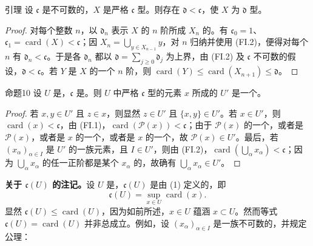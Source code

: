 \begin{SGAresult}{引理}{}
设 $\mathfrak{c}$ 是不可数的，$X$ 是严格 $\mathfrak{c}$ 型。则存在 $\mathfrak{d}<\mathfrak{c}$，使 $X$ 为 $\mathfrak{d}$ 型。
\end{SGAresult}
\begin{proof}
对每个整数 $n$，以 $\mathfrak{d}_n$ 表示 $X$ 的 $n$ 阶所成 $X_n$ 的。有 $\mathfrak{c}_0=1$、$\mathfrak{c}_1=\operatorname{card}(X)<\mathfrak{c}$；因 $X_n=\bigcup_{y\in X_{n-1}}y$，对 $n$ 归纳并使用 (FI.2)，便得对每个 $n$ 有 $\mathfrak{d}_n<\mathfrak{c}$。于是各 $\mathfrak{d}_n$ 都以 $\mathfrak{d}=\sum_{j\geq0}\mathfrak{d}_j$ 为上界，由 (FI.2) 及 $\mathfrak{c}$ 不可数的假设，$\mathfrak{d}<\mathfrak{c}$。若 $Y$ 是 $X$ 的一个 $n$ 阶，则 $\operatorname{card}(Y)\leq\operatorname{card}(X_{n+1})\leq\mathfrak{d}$。
\end{proof}
\begin{SGAresult}{命题}{10}
设 $U$ 是，$\mathfrak{c}$ 是。则 $U$ 中严格 $\mathfrak{c}$ 型的元素 $x$ 所成的 $U'$ 是一个。
\end{SGAresult}
\begin{proof}
若 $x,y\in U'$ 且 $z\in x$，则显然 $z\in U'$ 且 $\{x,y\}\in U'$。若 $x\in U'$，则 $\operatorname{card}(x)<\mathfrak{c}$，由 (FI.1)，$\operatorname{card}(\mathcal P(x))<\mathfrak{c}$；由于 $\mathcal P(x)$ 的一个，或者是 $\mathcal P(x)$，或者是 $x$ 的一个，或者是 $x$ 的一个，故 $\mathcal P(x)\in U'$。最后，若 $(x_\alpha)_{\alpha\in I}$ 是 $U'$ 的一族元素，且 $I\in U'$，则由 (FI.2)，$\operatorname{card}(\bigcup_\alpha x_\alpha)<\mathfrak{c}$；因为 $\bigcup_\alpha x_\alpha$ 的任一正阶都是某个 $x_\alpha$ 的，故确有 $\bigcup_\alpha x_\alpha\in U'$。
\end{proof}
\textbf{关于 $\mathfrak{c}(U)$ 的注记。}设 $U$ 是，$\mathfrak{c}(U)$ 是由 (1) 定义的，即
\[
 \mathfrak{c}(U)=\sup_{x\in U}\operatorname{card}(x).
\]
显然 $\mathfrak{c}(U)\leq\operatorname{card}(U)$，因为如前所述，$x\in U$ 蕴涵 $x\subset U$。然而等式 $\mathfrak{c}(U)=\operatorname{card}(U)$ 并非总成立。例如，设 $(x_\alpha)_{\alpha\in I}$ 是一族不可数的，并规定公理：
